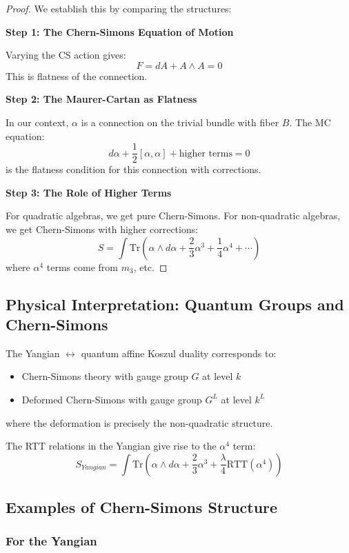\begin{proof}
We establish this by comparing the structures:

\textbf{Step 1: The Chern-Simons Equation of Motion}

Varying the CS action gives:
\[
F = dA + A \wedge A = 0
\]
This is flatness of the connection.

\textbf{Step 2: The Maurer-Cartan as Flatness}

In our context, $\alpha$ is a connection on the trivial bundle with fiber $B$. The MC equation:
\[
d\alpha + \frac{1}{2}[\alpha, \alpha] + \text{higher terms} = 0
\]
is the flatness condition for this connection with corrections.

\textbf{Step 3: The Role of Higher Terms}

For quadratic algebras, we get pure Chern-Simons.
For non-quadratic algebras, we get Chern-Simons with higher corrections:
\[
S = \int \text{Tr}\left(\alpha \wedge d\alpha + \frac{2}{3}\alpha^3 + \frac{1}{4}\alpha^4 + \cdots\right)
\]
where $\alpha^4$ terms come from $m_3$, etc.
\end{proof}

\subsection{Physical Interpretation: Quantum Groups and Chern-Simons}

\begin{theorem}
The Yangian $\leftrightarrow$ quantum affine Koszul duality corresponds to:
\begin{itemize}
\item Chern-Simons theory with gauge group $G$ at level $k$
\item Deformed Chern-Simons with gauge group $G^L$ at level $k^L$
\end{itemize}
where the deformation is precisely the non-quadratic structure.
\end{theorem}

The RTT relations in the Yangian give rise to the $\alpha^4$ term:
\[
S_{Yangian} = \int \text{Tr}\left(\alpha \wedge d\alpha + \frac{2}{3}\alpha^3 + \frac{\lambda}{4}\text{RTT}(\alpha^4)\right)
\]

\subsection{Examples of Chern-Simons Structure}

\subsubsection{For the Yangian}

